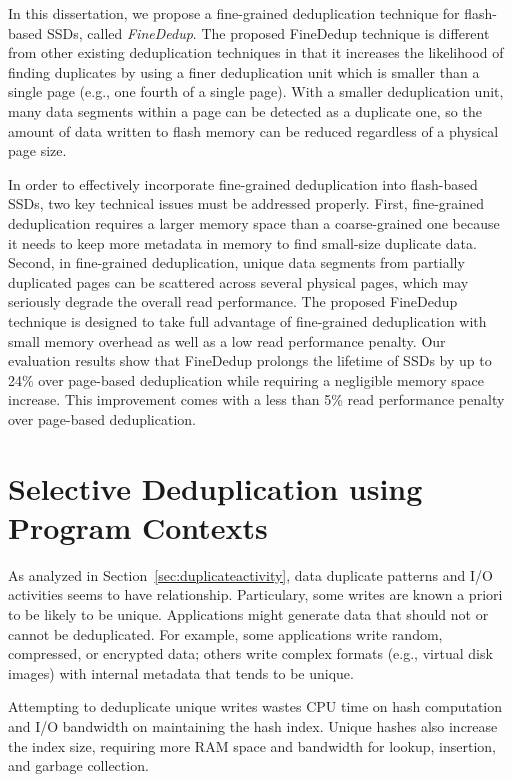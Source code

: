 In this dissertation, 
we propose a fine-grained deduplication technique for flash-based SSDs, called \textit{FineDedup}.
The proposed FineDedup technique is different from other existing deduplication techniques
in that it increases the likelihood of finding duplicates
by using a finer deduplication unit
which is smaller than a single page (e.g., one fourth of a single page).
With a smaller deduplication unit,
many data segments within a page can be detected as a duplicate one, 
so the amount of data written to flash memory can be reduced regardless of a physical page size.

In order to effectively incorporate fine-grained deduplication into flash-based SSDs,
two key technical issues must be addressed properly.
First, fine-grained deduplication requires a larger memory space than a coarse-grained one 
because it needs to keep more metadata in memory to find small-size duplicate data.
Second, in fine-grained deduplication, 
unique data segments from partially duplicated pages can be scattered across several physical pages,
which may seriously degrade the overall read performance.
The proposed FineDedup technique is designed to take full advantage of fine-grained deduplication
with small memory overhead as well as a low read performance penalty.
Our evaluation results show that 
FineDedup prolongs the lifetime of SSDs by up to 24\% over page-based deduplication
while requiring a negligible memory space increase.
This improvement comes with a less than 5\% read performance penalty over page-based deduplication.

\section{Selective Deduplication using Program Contexts}
As analyzed in Section~\ref{sec:duplicateactivity}, data duplicate patterns and I/O activities seems to
have relationship. 
Particulary, some writes are known a priori
to be likely to be unique. Applications might generate
data that should not or cannot be deduplicated. For
example, some applications write random, compressed,
or encrypted data; others write complex formats (e.g.,
virtual disk images) with internal metadata that tends to
be unique.

Attempting to deduplicate unique writes wastes CPU
time on hash computation and I/O bandwidth on maintaining
the hash index. Unique hashes also increase the
index size, requiring more RAM space and bandwidth
for lookup, insertion, and garbage collection.

